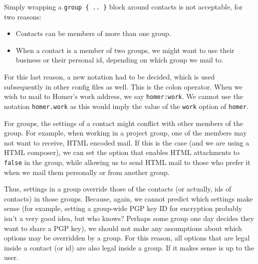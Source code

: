 \documentclass[a4paper]{article}
\begin{document}
Simply wrapping a \texttt{group \{ .. \}} block around contacts is not
acceptable, for two reasons:
\begin{itemize}
\item Contacts can be members of more than one group.
\item When a contact is a member of two groups, we might want to use
	their business or their personal id, depending on which group we
	mail to.
\end{itemize}
For this last reason, a new notation had to be decided, which is used
subsequently in other config files as well.  This is the colon
operator.  When we wish to mail to Homer's work address, we say
\texttt{homer:work}.  We cannot use the notation \texttt{homer.work} as
this would imply the value of the \texttt{work} option of \texttt{homer}.

For groups, the settings of a contact might conflict with other members
of the group.  For example, when working in a project group, one of the
members may not want to receive, HTML encoded mail.  If this is the
case (and we are using a HTML composer), we can set the option that
enables HTML attachments to \texttt{false} in the group, while allowing
us to send HTML mail to those who prefer it when we mail them personally
or from another group.

Thus, settings in a group override those of the contacts (or actually,
ids of contacts) in those groups.  Because, again, we cannot predict
which settings make sense (for example, setting a group-wide PGP key ID for
encryption probably isn't a very good idea, but who knows?  Perhaps some
group one day decides they want to share a PGP key), we should not make any
assumptions about which options may be overridden by a group.
For this reason, all options that are legal inside a contact (or id) are
also legal inside a group.  If it makes sense is up to the user.
\end{document}
